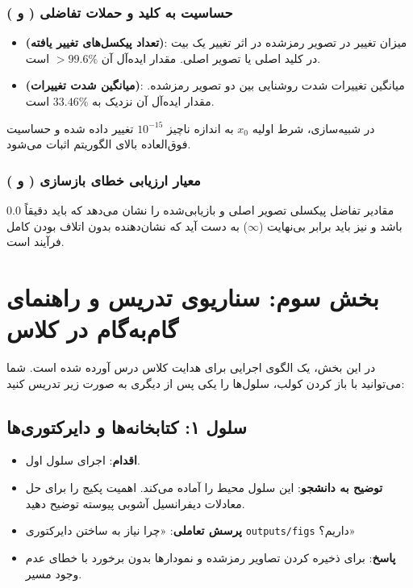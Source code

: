 \subsection{حساسیت به کلید و حملات تفاضلی ( و )}
\begin{itemize}
    \item \textbf{ (تعداد پیکسل‌های تغییر یافته)}: میزان تغییر در تصویر رمزشده در اثر تغییر یک بیت در کلید اصلی یا تصویر اصلی. مقدار ایده‌آل آن $>99.6\%$ است.
    \item \textbf{ (میانگین شدت تغییرات)}: میانگین تغییرات شدت روشنایی بین دو تصویر رمزشده. مقدار ایده‌آل آن نزدیک به $33.46\%$ است.
\end{itemize}
در شبیه‌سازی، شرط اولیه $x_0$ به اندازه ناچیز $10^{-15}$ تغییر داده شده و حساسیت فوق‌العاده بالای الگوریتم اثبات می‌شود.

\subsection{معیار ارزیابی خطای بازسازی ( و )}
مقادیر  تفاضل پیکسلی تصویر اصلی و بازیابی‌شده را نشان می‌دهد که باید دقیقاً $0.0$ باشد و  نیز باید برابر بی‌نهایت ($\infty$) به دست آید که نشان‌دهنده بدون اتلاف بودن کامل فرآیند است.

\chapter{بخش سوم: سناریوی تدریس و راهنمای گام‌به‌گام در کلاس}
در این بخش، یک الگوی اجرایی برای هدایت کلاس درس آورده شده است. شما می‌توانید با باز کردن کولب، سلول‌ها را یکی پس از دیگری به صورت زیر تدریس کنید:

\section{سلول ۱: کتابخانه‌ها و دایرکتوری‌ها}
\begin{itemize}
    \item \textbf{اقدام}: اجرای سلول اول.
    \item \textbf{توضیح به دانشجو}: این سلول محیط را آماده می‌کند. اهمیت پکیج \texttt{} را برای حل معادلات دیفرانسیل آشوبی پیوسته توضیح دهید.
    \item \textbf{پرسش تعاملی}: «چرا نیاز به ساختن دایرکتوری \texttt{outputs/figs} داریم؟»
    \item \textbf{پاسخ}: برای ذخیره کردن تصاویر رمزشده و نمودارها بدون برخورد با خطای عدم وجود مسیر.
\end{itemize}

